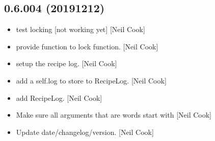 \documentclass[a4paper,10pt,english]{report}
\begin{document}
\subsection{0.6.004 (2019\sphinxhyphen{}12\sphinxhyphen{}12)}
\label{\detokenize{misc/changelog:id34}}\begin{itemize}
\item {} 
 \sphinxhyphen{} test locking {[}not working yet{]} {[}Neil Cook{]}

\item {} 
 \sphinxhyphen{} provide function to lock function. {[}Neil Cook{]}

\item {} 
 \sphinxhyphen{} setup the recipe log. {[}Neil Cook{]}

\item {} 
 \sphinxhyphen{} add a self.log to store to RecipeLog. {[}Neil
Cook{]}

\item {} 
 \sphinxhyphen{} add RecipeLog. {[}Neil Cook{]}

\item {} 
Make sure all arguments that are words start with \textendash{} {[}Neil Cook{]}

\item {} 
Update date/changelog/version. {[}Neil Cook{]}

\end{itemize}
\end{document}
